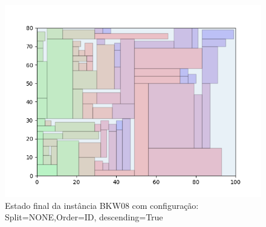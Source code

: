 \begin{figure}[H]
    \centering
    \caption[]{Estado final da instância BKW08 com configuração: Split=NONE,Order=ID, descending=True}
    \label{fig:bkw08-none-id-true}
    \includegraphics[scale=0.5]{output/figures/bkw/bkw08/none/id/true/00}
\end{figure}
